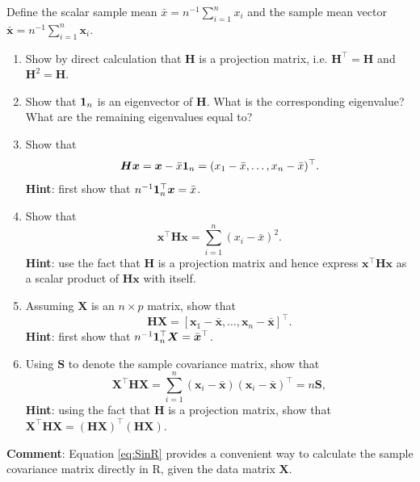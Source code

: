 \documentclass[]{book}
\theoremstyle{definition}
\theoremstyle{definition}
\theoremstyle{definition}
\theoremstyle{remark}
\begin{document}
\begin{enumerate}
  Define the scalar sample mean \(\bar{x}=n^{-1}\sum_{i=1}^n x_i\) and the sample mean vector \(\bar{\boldsymbol x}=n^{-1} \sum_{i=1}^n \boldsymbol x_i\).

  \begin{enumerate}
  \def\labelenumii{\roman{enumii}.}
  \item
    Show by direct calculation that \(\boldsymbol H\) is a projection matrix, i.e. \(\boldsymbol H^\top = \boldsymbol H\) and \(\boldsymbol H^2 =\boldsymbol H\).
  \item
    Show that \({\bf 1}_n\) is an eigenvector of \(\boldsymbol H\). What is the corresponding eigenvalue? What are the remaining eigenvalues equal to?
  \item
    Show that
    \[
      \boldsymbol H\boldsymbol x= \boldsymbol x- \bar{x}{\bf 1}_n = (  x_1 - \bar{x}, \ldots , x_n -\bar{x})^\top.
      \]
    \textbf{Hint}: first show that \(n^{-1}{\bf 1}_n^\top \boldsymbol x=\bar{x}\).
  \item
    Show that
    \[
      \boldsymbol x^\top \boldsymbol H\boldsymbol x= \sum_{i=1}^n (x_i-\bar{x})^2.
      \]
    \textbf{Hint}: use the fact that \(\boldsymbol H\) is a projection matrix and hence express \(\boldsymbol x^\top \boldsymbol H\boldsymbol x\) as a scalar product of \(\boldsymbol H\boldsymbol x\) with itself.
  \item
    Assuming \(\boldsymbol X\) is an \(n \times p\) matrix, show that
    \[
      \boldsymbol H\boldsymbol X=[\boldsymbol x_1 - \bar{\boldsymbol x}, \ldots , \boldsymbol x_n -\bar{\boldsymbol x}]^\top.
      \]
    \textbf{Hint}: first show that \(n^{-1} {\bf 1}_n^\top \boldsymbol X=\bar{\boldsymbol x}^\top\).
  \item
    Using \(\boldsymbol S\) to denote the sample covariance matrix, show that
    \begin{equation}
      \boldsymbol X^\top \boldsymbol H\boldsymbol X= \sum_{i=1}^n (\boldsymbol x_i -\bar{\boldsymbol x})(\boldsymbol x_i -\bar{\boldsymbol x})^\top = n\boldsymbol S,
       \label{eq:SinR}
      \end{equation}
    \textbf{Hint}: using the fact that \(\boldsymbol H\) is a projection matrix,
    show that
    \(\boldsymbol X^\top \boldsymbol H\boldsymbol X=(\boldsymbol H\boldsymbol X)^\top (\boldsymbol H\boldsymbol X)\).
  \end{enumerate}

  \textbf{Comment}: Equation \eqref{eq:SinR} provides a convenient way to calculate the sample covariance matrix directly in R, given the data matrix \(\boldsymbol X\).
\end{enumerate}
\end{document}

